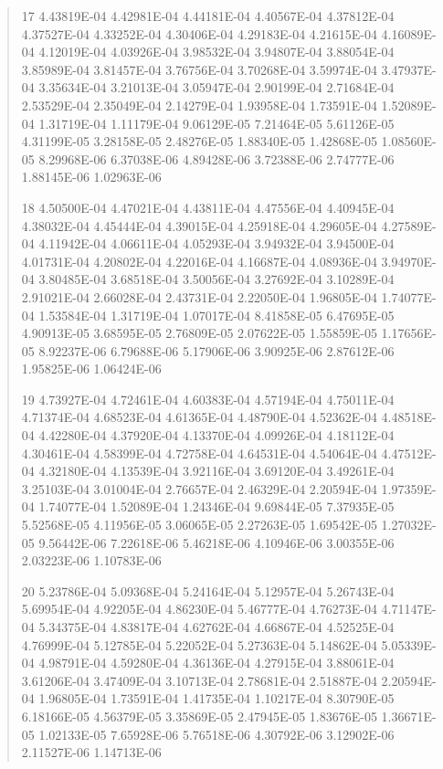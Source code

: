 \documentclass[letterpaper,10pt,english]{sphinxmanual}
\begin{document}
\begin{quote}
\begin{DUlineblock}{0em}
\item[] 17   4.43819E-04  4.42981E-04  4.44181E-04  4.40567E-04  4.37812E-04  4.37527E-04  4.33252E-04  4.30406E-04  4.29183E-04  4.21615E-04  4.16089E-04  4.12019E-04  4.03926E-04  3.98532E-04  3.94807E-04  3.88054E-04  3.85989E-04  3.81457E-04  3.76756E-04  3.70268E-04  3.59974E-04  3.47937E-04  3.35634E-04  3.21013E-04  3.05947E-04  2.90199E-04  2.71684E-04  2.53529E-04  2.35049E-04  2.14279E-04  1.93958E-04  1.73591E-04  1.52089E-04  1.31719E-04  1.11179E-04  9.06129E-05  7.21464E-05  5.61126E-05  4.31199E-05  3.28158E-05  2.48276E-05  1.88340E-05  1.42868E-05  1.08560E-05  8.29968E-06  6.37038E-06  4.89428E-06  3.72388E-06  2.74777E-06  1.88145E-06  1.02963E-06
\item[] 18   4.50500E-04  4.47021E-04  4.43811E-04  4.47556E-04  4.40945E-04  4.38032E-04  4.45444E-04  4.39015E-04  4.25918E-04  4.29605E-04  4.27589E-04  4.11942E-04  4.06611E-04  4.05293E-04  3.94932E-04  3.94500E-04  4.01731E-04  4.20802E-04  4.22016E-04  4.16687E-04  4.08936E-04  3.94970E-04  3.80485E-04  3.68518E-04  3.50056E-04  3.27692E-04  3.10289E-04  2.91021E-04  2.66028E-04  2.43731E-04  2.22050E-04  1.96805E-04  1.74077E-04  1.53584E-04  1.31719E-04  1.07017E-04  8.41858E-05  6.47695E-05  4.90913E-05  3.68595E-05  2.76809E-05  2.07622E-05  1.55859E-05  1.17656E-05  8.92237E-06  6.79688E-06  5.17906E-06  3.90925E-06  2.87612E-06  1.95825E-06  1.06424E-06
\item[] 19   4.73927E-04  4.72461E-04  4.60383E-04  4.57194E-04  4.75011E-04  4.71374E-04  4.68523E-04  4.61365E-04  4.48790E-04  4.52362E-04  4.48518E-04  4.42280E-04  4.37920E-04  4.13370E-04  4.09926E-04  4.18112E-04  4.30461E-04  4.58399E-04  4.72758E-04  4.64531E-04  4.54064E-04  4.47512E-04  4.32180E-04  4.13539E-04  3.92116E-04  3.69120E-04  3.49261E-04  3.25103E-04  3.01004E-04  2.76657E-04  2.46329E-04  2.20594E-04  1.97359E-04  1.74077E-04  1.52089E-04  1.24346E-04  9.69844E-05  7.37935E-05  5.52568E-05  4.11956E-05  3.06065E-05  2.27263E-05  1.69542E-05  1.27032E-05  9.56442E-06  7.22618E-06  5.46218E-06  4.10946E-06  3.00355E-06  2.03223E-06  1.10783E-06
\item[] 20   5.23786E-04  5.09368E-04  5.24164E-04  5.12957E-04  5.26743E-04  5.69954E-04  4.92205E-04  4.86230E-04  5.46777E-04  4.76273E-04  4.71147E-04  5.34375E-04  4.83817E-04  4.62762E-04  4.66867E-04  4.52525E-04  4.76999E-04  5.12785E-04  5.22052E-04  5.27363E-04  5.14862E-04  5.05339E-04  4.98791E-04  4.59280E-04  4.36136E-04  4.27915E-04  3.88061E-04  3.61206E-04  3.47409E-04  3.10713E-04  2.78681E-04  2.51887E-04  2.20594E-04  1.96805E-04  1.73591E-04  1.41735E-04  1.10217E-04  8.30790E-05  6.18166E-05  4.56379E-05  3.35869E-05  2.47945E-05  1.83676E-05  1.36671E-05  1.02133E-05  7.65928E-06  5.76518E-06  4.30792E-06  3.12902E-06  2.11527E-06  1.14713E-06

\end{DUlineblock}
\end{quote}
\end{document}
